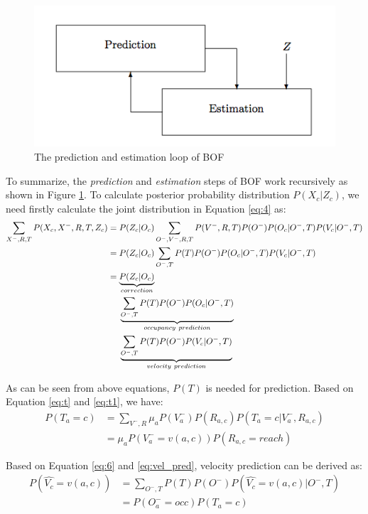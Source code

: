 \begin{figure}[ht]
  \centering
    \includegraphics[width=.6\textwidth]{figures/bof_recursive.png}
    \caption[The prediction and estimation loop of BOF.]{The prediction and estimation loop of BOF \citep{tay2008bayesian}}
    \label{fig:bof_recursive}
\end{figure} 

To summarize, the \textit{prediction} and \textit{estimation} steps of BOF work recursively as shown in Figure \ref{fig:bof_recursive}. To calculate posterior probability distribution $P(X_c|Z_c)$, we need firstly calculate the joint distribution in Equation \ref{eq:4} as:
\begin{align}
\sum_{X^-, R, T}P(X_c, X^-, R, T, Z_c) &= P(Z_c|O_c) \sum_{O^-, V^-, R, T}P(V^-,R,T)P(O^-)P(O_c|O^-,T)P(V_c|O^-,T) \notag  \\
                        &= P(Z_c|O_c) \sum_{O^-, T}P(T)P(O^-)P(O_c|O^-,T)P(V_c|O^-,T) \notag \\
                        &=  \underbrace{P(Z_c|O_c)}_{correction} \notag \\
                        & \ \ \ \ \underbrace{\sum_{O^-, T}P(T)P(O^-)P(O_c|O^-,T)}_{occupancy \ prediction} \label{eq:occ_pred} \\
                        & \ \ \ \ \underbrace{\sum_{O^-, T}P(T)P(O^-)P(V_c|O^-,T)}_{velocity  \  prediction} \label{eq:vel_pred}
\end{align}

As can be seen from above equations, $P(T)$ is needed for prediction. Based on Equation \ref{eq:t} and \ref{eq:t1}, we have:
\begin{align}
P(T_a = c) &= \sum_{V^-, R}{\mu_a P(V_a^-)P(R_{a,c})P(T_a=c|V_a^-, R_{a,c})} \\
		   &= \mu_a P(V_a^-=v(a,c))P(R_{a,c}=reach)
\end{align}

Based on Equation \ref{eq:6} and \ref{eq:vel_pred}, velocity prediction can be derived as:
\begin{align}
P(\hat{V_c}=v(a, c)) &= \sum_{O^-, T}P(T)P(O^-)P(\hat{V_c}=v(a,c)|O^-,T) \\
  &= P(O_a^-=occ)P(T_a=c) \label{eq:infer_velocity}
\end{align}


